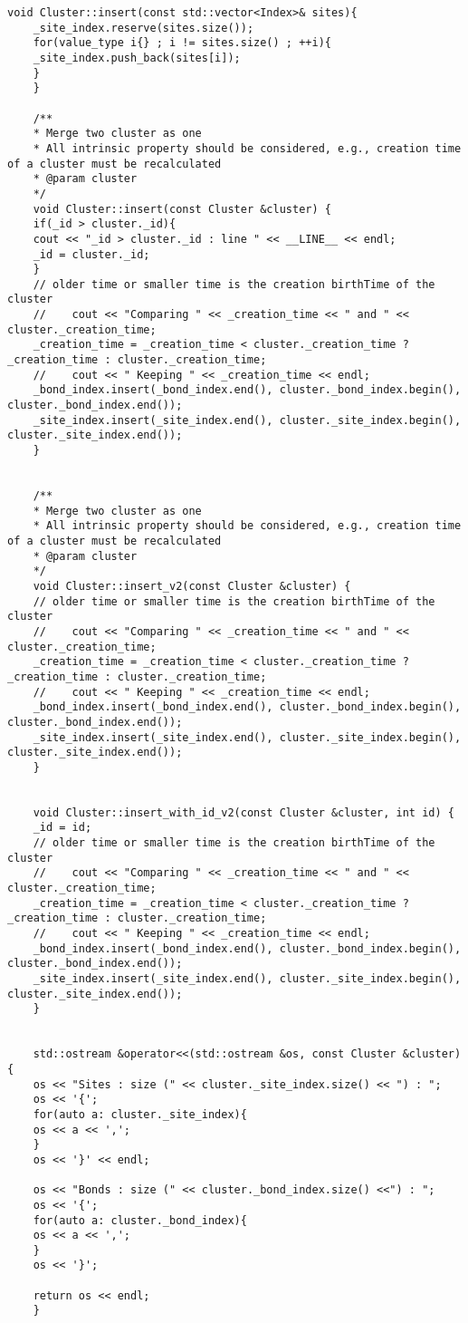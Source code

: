 \begin{lstlisting}[style=CStyle]
	void Cluster::insert(const std::vector<Index>& sites){
	_site_index.reserve(sites.size());
	for(value_type i{} ; i != sites.size() ; ++i){
	_site_index.push_back(sites[i]);
	}
	}
	
	/**
	* Merge two cluster as one
	* All intrinsic property should be considered, e.g., creation time of a cluster must be recalculated
	* @param cluster
	*/
	void Cluster::insert(const Cluster &cluster) {
	if(_id > cluster._id){
	cout << "_id > cluster._id : line " << __LINE__ << endl;
	_id = cluster._id;
	}
	// older time or smaller time is the creation birthTime of the cluster
	//    cout << "Comparing " << _creation_time << " and " << cluster._creation_time;
	_creation_time = _creation_time < cluster._creation_time ? _creation_time : cluster._creation_time;
	//    cout << " Keeping " << _creation_time << endl;
	_bond_index.insert(_bond_index.end(), cluster._bond_index.begin(), cluster._bond_index.end());
	_site_index.insert(_site_index.end(), cluster._site_index.begin(), cluster._site_index.end());
	}
	
	
	/**
	* Merge two cluster as one
	* All intrinsic property should be considered, e.g., creation time of a cluster must be recalculated
	* @param cluster
	*/
	void Cluster::insert_v2(const Cluster &cluster) {
	// older time or smaller time is the creation birthTime of the cluster
	//    cout << "Comparing " << _creation_time << " and " << cluster._creation_time;
	_creation_time = _creation_time < cluster._creation_time ? _creation_time : cluster._creation_time;
	//    cout << " Keeping " << _creation_time << endl;
	_bond_index.insert(_bond_index.end(), cluster._bond_index.begin(), cluster._bond_index.end());
	_site_index.insert(_site_index.end(), cluster._site_index.begin(), cluster._site_index.end());
	}
	
	
	void Cluster::insert_with_id_v2(const Cluster &cluster, int id) {
	_id = id;
	// older time or smaller time is the creation birthTime of the cluster
	//    cout << "Comparing " << _creation_time << " and " << cluster._creation_time;
	_creation_time = _creation_time < cluster._creation_time ? _creation_time : cluster._creation_time;
	//    cout << " Keeping " << _creation_time << endl;
	_bond_index.insert(_bond_index.end(), cluster._bond_index.begin(), cluster._bond_index.end());
	_site_index.insert(_site_index.end(), cluster._site_index.begin(), cluster._site_index.end());
	}
	
	
	std::ostream &operator<<(std::ostream &os, const Cluster &cluster) {
	os << "Sites : size (" << cluster._site_index.size() << ") : ";
	os << '{';
	for(auto a: cluster._site_index){
	os << a << ',';
	}
	os << '}' << endl;
	
	os << "Bonds : size (" << cluster._bond_index.size() <<") : ";
	os << '{';
	for(auto a: cluster._bond_index){
	os << a << ',';
	}
	os << '}';
	
	return os << endl;
	}
	
	\end{lstlisting}
	
